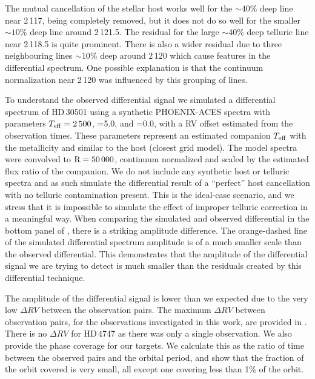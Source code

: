 The mutual cancellation of the stellar host works well for the \(\sim40\%\) deep line near 2\,117\nm{}, being completely removed, but it does not do so well for the smaller \(\sim10\%\) deep line around 2\,121.5\nm{}. The residual for the large \(\sim40\%\) deep telluric line near 2\,118.5\nm{} is quite prominent. There is also a wider residual due to three neighbouring lines \(\sim10\%\) deep around 2\,120\nm{} which cause features in the differential spectrum. One possible explanation is that the continuum normalization near 2\,120\nm{} was influenced by this grouping of lines.

To understand the observed differential signal we simulated a differential spectrum of {HD\,30501} using a synthetic {PHOENIX-ACES} spectra with parameters \(T_{\mathrm{eff}}{}=2\,500\)\K{}, \logg{}=5.0, and \feh{}=0.0, with a {RV} offset estimated from the observation times. These parameters represent an estimated companion \(T_{\mathrm{eff}}{}\) with the metallicity and \logg{} similar to the host (closest grid model). The model spectra were convolved to \(\textrm{R}=50\,000\), continuum normalized and scaled by the estimated flux ratio of the companion. We do not include any synthetic host or telluric spectra and as such simulate the differential result of a ``perfect'' host cancellation with no telluric contamination present. This is the ideal-case scenario, and we stress that it is impossible to simulate the effect of improper telluric correction in a meaningful way. When comparing the simulated and observed differential in the bottom panel of , there is a striking amplitude difference. The orange-dashed line of the simulated differential spectrum amplitude is of a much smaller scale than the observed differential. This demonstrates that the amplitude of the differential signal we are trying to detect is much smaller than the residuals created by this differential technique.

The amplitude of the differential signal is lower than we expected due to the very low \(\Delta {RV}\) between the observation pairs. The maximum \(\Delta {RV}\) between observation pairs, for the observations investigated in this work, are provided in . {\red{} There is no \(\Delta {RV}\) for {HD\,4747} as there was only a single observation. We also provide the phase coverage for our targets. We calculate this as the ratio of time between the observed pairs and the orbital period, and show that the fraction of the orbit covered is very small, all except one covering less than 1\% of the orbit.}

